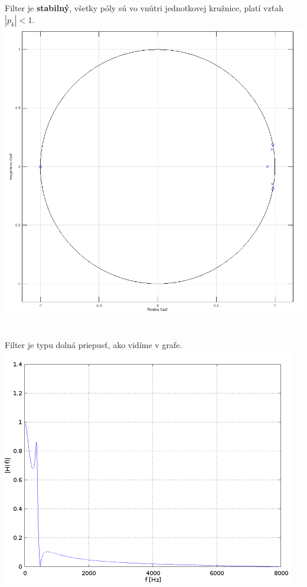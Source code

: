 \documentclass[a4paper,12pt,twocolumn]{article}
\begin{document}
\section{}
Filter je \textbf{stabilný}, všetky póly sú vo vnútri jednotkovej kružnice, platí vzťah $ |p_k| < 1 $.
\includegraphics[width=\linewidth]{3}
\section{}
Filter je typu dolná priepusť, ako vidíme v grafe.
\includegraphics[width=\linewidth]{4}
\end{document}
